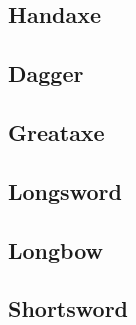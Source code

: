 \subsection{Handaxe}\label{skill:handaxe}

\subsection{Dagger}\label{skill:dagger}

\subsection{Greataxe}\label{skill:greataxe}

\subsection{Longsword}\label{skill:longsword}

\subsection{Longbow}\label{skill:longbow}

\subsection{Shortsword}\label{skill:shortsword}
